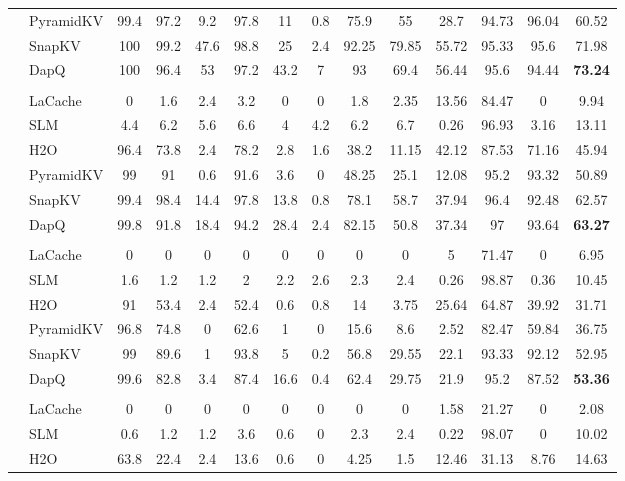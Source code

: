 \begin{table}[t]
{\begin{tabular}{>{\bfseries}c >{\raggedright}p{2.2cm} *{12}{c}}
& PyramidKV & 99.4 & 97.2 & 9.2 & 97.8 & 11 & 0.8 & 75.9 & 55 & 28.7 & 94.73 & 96.04 & 60.52 \\
& SnapKV & 100 & 99.2 & 47.6 & 98.8 & 25 & 2.4 & 92.25 & 79.85 & 55.72 & 95.33 & 95.6 & 71.98 \\
& DapQ & 100 & 96.4 & 53 & 97.2 & 43.2 & 7 & 93 & 69.4 & 56.44 & 95.6 & 94.44 & \textbf{73.24} \\
& \multicolumn{13}{c}{\cellcolor{gray!20}\textbf{KV Cache Size = 1024}} \\
& LaCache & 0 & 1.6 & 2.4 & 3.2 & 0 & 0 & 1.8 & 2.35 & 13.56 & 84.47 & 0 & 9.94 \\
& SLM & 4.4 & 6.2 & 5.6 & 6.6 & 4 & 4.2 & 6.2 & 6.7 & 0.26 & 96.93 & 3.16 & 13.11 \\
& H2O & 96.4 & 73.8 & 2.4 & 78.2 & 2.8 & 1.6 & 38.2 & 11.15 & 42.12 & 87.53 & 71.16 & 45.94 \\
& PyramidKV & 99 & 91 & 0.6 & 91.6 & 3.6 & 0 & 48.25 & 25.1 & 12.08 & 95.2 & 93.32 & 50.89 \\
& SnapKV & 99.4 & 98.4 & 14.4 & 97.8 & 13.8 & 0.8 & 78.1 & 58.7 & 37.94 & 96.4 & 92.48 & 62.57 \\
& DapQ & 99.8 & 91.8 & 18.4 & 94.2 & 28.4 & 2.4 & 82.15 & 50.8 & 37.34 & 97 & 93.64 & \textbf{63.27} \\
& \multicolumn{13}{c}{\cellcolor{gray!20}\textbf{KV Cache Size = 512}} \\
& LaCache & 0 & 0 & 0 & 0 & 0 & 0 & 0 & 0 & 5 & 71.47 & 0 & 6.95 \\
& SLM & 1.6 & 1.2 & 1.2 & 2 & 2.2 & 2.6 & 2.3 & 2.4 & 0.26 & 98.87 & 0.36 & 10.45 \\
& H2O & 91 & 53.4 & 2.4 & 52.4 & 0.6 & 0.8 & 14 & 3.75 & 25.64 & 64.87 & 39.92 & 31.71 \\
& PyramidKV & 96.8 & 74.8 & 0 & 62.6 & 1 & 0 & 15.6 & 8.6 & 2.52 & 82.47 & 59.84 & 36.75 \\
& SnapKV & 99 & 89.6 & 1 & 93.8 & 5 & 0.2 & 56.8 & 29.55 & 22.1 & 93.33 & 92.12 & 52.95 \\
& DapQ & 99.6 & 82.8 & 3.4 & 87.4 & 16.6 & 0.4 & 62.4 & 29.75 & 21.9 & 95.2 & 87.52 & \textbf{53.36} \\
& \multicolumn{13}{c}{\cellcolor{gray!20}\textbf{KV Cache Size = 256}} \\
& LaCache & 0 & 0 & 0 & 0 & 0 & 0 & 0 & 0 & 1.58 & 21.27 & 0 & 2.08 \\
& SLM & 0.6 & 1.2 & 1.2 & 3.6 & 0.6 & 0 & 2.3 & 2.4 & 0.22 & 98.07 & 0 & 10.02 \\
& H2O & 63.8 & 22.4 & 2.4 & 13.6 & 0.6 & 0 & 4.25 & 1.5 & 12.46 & 31.13 & 8.76 & 14.63 \\

\end{tabular}}
\end{table}
